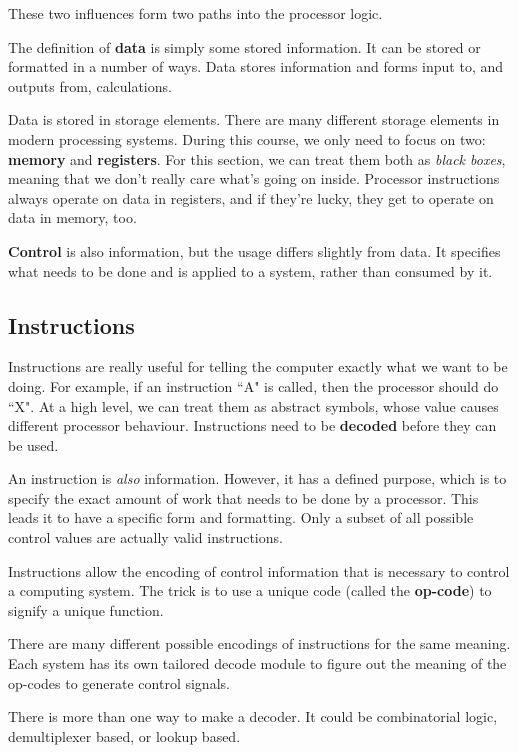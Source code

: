 \documentclass[11pt,a4paper,titlepage,dvipsnames,cmyk]{scrartcl}
\begin{document}
These two influences form two paths into the processor logic.

The definition of \textbf{data} is simply some stored information. It can
be stored or formatted in a number of ways. Data stores information and
forms input to, and outputs from, calculations.

Data is stored in storage elements. There are many different storage
elements in modern processing systems. During this course, we only need to
focus on two: \textbf{memory} and \textbf{registers}. For this section, we
can treat them both as \textit{black boxes}, meaning that we don't really
care what's going on inside. Processor instructions always operate on data
in registers, and if they're lucky, they get to operate on data in memory,
too.

\textbf{Control} is also information, but the usage differs slightly from
data. It specifies what needs to be done and is applied to a system,
rather than consumed by it.

\subsection{Instructions}%
\label{sub:Instructions}
Instructions are really useful for telling the computer exactly what we
want to be doing. For example, if an instruction ``A" is called, then the
processor should do ``X". At a high level, we can treat them as abstract
symbols, whose value causes different processor behaviour. Instructions
need to be \textbf{decoded} before they can be used.

An instruction is \textit{also} information. However, it has a defined
purpose, which is to specify the exact amount of work that needs to be
done by a processor. This leads it to have a specific form and formatting.
Only a subset of all possible control values are actually valid
instructions.

Instructions allow the encoding of control information that is necessary
to control a computing system. The trick is to use a unique code (called
the \textbf{op-code}) to signify a unique function.

There are many different possible encodings of instructions for the same
meaning. Each system has its own tailored decode module to figure out the
meaning of the op-codes to generate control signals.

There is more than one way to make a decoder. It could be combinatorial
logic, demultiplexer based, or lookup based.
\end{document}
